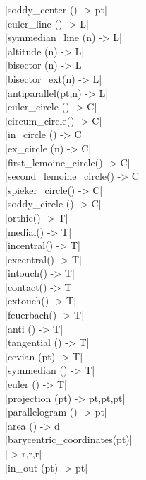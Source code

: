 \documentclass[DIV         = 14,
               fontsize    = 10,
               index       = totoc,
               twoside,
               cadre,
               headings    = small
               ]{tkz-doc}
\begin{document}
\begin{multicols}{3}
|soddy_center ()           -> pt|  \\
|euler_line ()             -> L|   \\
|symmedian_line (n)        -> L|   \\
|altitude (n)              -> L|   \\
|bisector (n)              -> L|   \\
|bisector_ext(n)           -> L|   \\
|antiparallel(pt,n)        -> L|   \\
|euler_circle ()           -> C|   \\
|circum_circle()           -> C|   \\
|in_circle ()              -> C|   \\
|ex_circle (n)             -> C|   \\
|first_lemoine_circle()    -> C|   \\
|second_lemoine_circle()   -> C|   \\
|spieker_circle()          -> C|   \\
|soddy_circle ()           -> C|   \\
|orthic()                  -> T|   \\
|medial()                  -> T|   \\
|incentral()               -> T|   \\
|excentral()               -> T|   \\
|intouch()                 -> T|   \\
|contact()                 -> T|   \\
|extouch()                 -> T|   \\
|feuerbach()               -> T|   \\
|anti ()                   -> T|   \\
|tangential ()             -> T|   \\
|cevian (pt)               -> T|   \\
|symmedian ()              -> T|   \\
|euler ()                  -> T|   \\
|projection (pt)     -> pt,pt,pt|  \\
|parallelogram ()          -> pt|  \\
|area ()                   -> d|   \\
|barycentric_coordinates(pt)|      \\
                      |-> r,r,r|   \\
|in_out (pt)               -> pt|  \\

\end{multicols}
\end{document}
